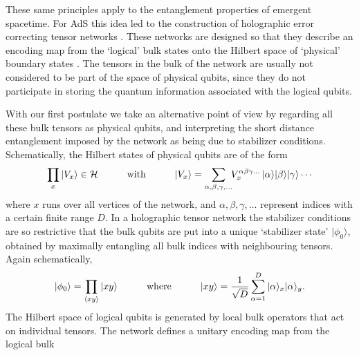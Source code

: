 \documentclass[a4paper,12pt]{article}
\newcommand{\be}{\begin{equation}}
\newcommand{\ee}{\end{equation}}
\begin{document}
These same principles apply to the entanglement properties of emergent spacetime. For AdS this idea led to the construction of holographic error correcting tensor networks \cite{HarlowPreskill,Haydenetal}. 
 These networks are designed so that they describe an encoding map from the `logical' bulk states onto the Hilbert space of `physical' boundary states \cite{Harlow}.  The tensors in the bulk of the network are usually not considered to be part of the space of physical qubits, since they do not participate in storing the quantum information associated with the logical qubits. 
  
With our first postulate we take an alternative point of view by regarding all these 
bulk tensors as physical qubits, and interpreting the short distance entanglement imposed 
by the network as being due to   stabilizer conditions.  Schematically, the Hilbert states of physical qubits are of the form\\[-2mm]
\be
   \prod_x|V_x\rangle \in {\cal H}%
   \qquad\quad \mbox{with} \qquad \quad
   |V_x\rangle =\sum_{\alpha,\beta,\gamma,\ldots}\!\! V_x^{\alpha\beta\gamma\ldots}\, |\alpha\rangle|\beta\rangle|\gamma\rangle \cdots\\[-2mm]
\ee 
where $x$ runs over all vertices of the network, and $\alpha,\beta,\gamma,\ldots $  represent indices with a certain finite range $D$. In a holographic tensor network the stabilizer conditions are so restrictive that the bulk qubits are put into a unique `stabilizer state' $|\phi_0\rangle$, obtained by maximally entangling all bulk indices with neighbouring tensors.     
Again schematically, \\[-2mm]
\be
|\phi_0\rangle = \prod_{\langle xy\rangle} |xy\rangle \qquad\quad\mbox{where}\qquad\quad%
| xy\rangle = {1\over \sqrt{D} }\sum_{\alpha=1}^{D}|\alpha\rangle_x|\alpha\rangle_y.
\ee
 The Hilbert space of logical qubits is generated by local bulk operators that act on 
 individual tensors.  The network defines a unitary encoding map from the logical bulk 
\end{document}

